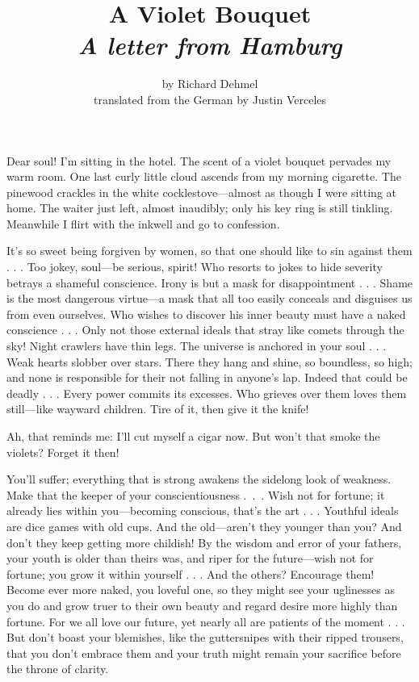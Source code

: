 \documentclass[12pt,a4paper]{article}
\title{A Violet Bouquet\\ \large{\textit{A letter from Hamburg}}}
\author{by Richard Dehmel\\translated from the German by Justin Verceles}
\date{}
\begin{document}
\maketitle

Dear soul! I’m sitting in the hotel. The scent of a violet bouquet pervades my warm room. One last curly little cloud ascends from my morning cigarette. The pinewood crackles in the white cocklestove—almost as though I were sitting at home. The waiter just left, almost inaudibly; only his key ring is still tinkling. Meanwhile I flirt with the inkwell and go to confession.

It’s so sweet being forgiven by women, so that one should like to sin against them . . . Too jokey, soul—be serious, spirit! Who resorts to jokes to hide severity betrays a shameful conscience. Irony is but a mask for disappointment . . . Shame is the most dangerous virtue—a mask that all too easily conceals and disguises us from even ourselves. Who wishes to discover his inner beauty must have a naked conscience . . . Only not those external ideals that stray like comets through the sky! Night crawlers have thin legs. The universe is anchored in your soul . . . Weak hearts slobber over stars. There they hang and shine, so boundless, so high; and none is responsible for their not falling in anyone’s lap. Indeed that could be deadly . . . Every power commits its excesses. Who grieves over them loves them still—like wayward children. Tire of it, then give it the knife!

Ah, that reminds me: I’ll cut myself a cigar now. But won’t that smoke the violets? Forget it then!

You’ll suffer; everything that is strong awakens the sidelong look of weakness. Make that the keeper of your conscientiousness \mbox{. . .} Wish not for fortune; it already lies within you—becoming conscious, that’s the art . . . Youthful ideals are dice games with old cups. And the old—aren’t they younger than you? And don’t they keep getting more childish! By the wisdom and error of your fathers, your youth is older than theirs was, and riper for the future—wish not for fortune; you grow it within yourself . . . And the others? Encourage them! Become ever more naked, you loveful one, so they might see your uglinesses as you do and grow truer to their own beauty and regard desire more highly than fortune. For we all love our future, yet nearly all are patients of the moment . . . But don’t boast your blemishes, like the guttersnipes with their ripped trousers, that you don’t embrace them and your truth might remain your sacrifice before the throne of clarity. 
\end{document}
